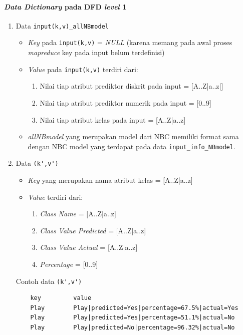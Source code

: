 \paragraph{\textit{Data Dictionary} pada DFD \textit{level} 1}
\begin{enumerate}
	\item{Data \verb|input(k,v)_allNBmodel|}
	\begin{itemize}
		\item \textit{Key} pada \verb|input(k,v)| = \textit{NULL} (karena memang pada awal proses \textit{mapreduce} key pada input belum terdefinisi)

		\item \textit{Value} pada \verb|input(k,v)| terdiri dari:
		\begin{enumerate}
			\item Nilai tiap atribut prediktor diskrit pada input = [A..Z|a..z|]
			\item Nilai tiap atribut prediktor numerik pada input = [0..9]
			\item Nilai tiap atribut kelas pada input = [A..Z|a..z]
		\end{enumerate}

		\item \textit{allNBmodel} yang merupakan model dari NBC memiliki format sama dengan NBC model yang terdapat pada data \verb|input_info_NBmodel|.
		
	\end{itemize}
	
	\item{Data \verb|(k',v')|}
	\begin{itemize}
		\item \textit{Key} yang merupakan nama atribut kelas = [A..Z|a..z]
		\item \textit{Value} terdiri dari:
		\begin{enumerate}
			\item \textit{Class Name} = [A..Z|a..z]
			\item \textit{Class Value Predicted} = [A..Z|a..z]
			\item \textit{Class Value Actual} = [A..Z|a..z]
			\item \textit{Percentage} = [0..9]
		\end{enumerate}
	\end{itemize}
	Contoh data \verb|(k',v')|
	\begin{lstlisting}
	key			value
	Play		Play|predicted=Yes|percentage=67.5%|actual=Yes
	Play		Play|predicted=Yes|percentage=51.1%|actual=No
	Play		Play|predicted=No|percentage=96.32%|actual=No	
	\end{lstlisting}


\end{enumerate}
